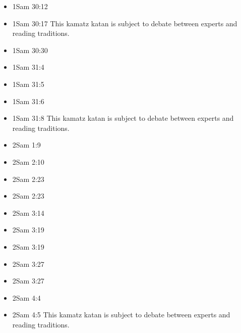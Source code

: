 \documentclass[14pt]{book}
\begin{document}
\begin{multicols}{2}
\begin{itemize}
							\item 1Sam 30:12
							
							\item 1Sam 30:17 This kamatz katan is subject to debate between experts and reading traditions.
							
							\item 1Sam 30:30
							
							\item 1Sam 31:4
							
							\item 1Sam 31:5
							
							\item 1Sam 31:6
							
							\item 1Sam 31:8 This kamatz katan is subject to debate between experts and reading traditions.
							
							\item 2Sam 1:9
							
							\item 2Sam 2:10
							
							\item 2Sam 2:23
							
							\item 2Sam 2:23
							
							\item 2Sam 3:14
							
							\item 2Sam 3:19
							
							\item 2Sam 3:19
							
							\item 2Sam 3:27
							
							\item 2Sam 3:27
							
							\item 2Sam 4:4
							
							\item 2Sam 4:5 This kamatz katan is subject to debate between experts and reading traditions.
							

\end{itemize}
\end{multicols}
\end{document}
